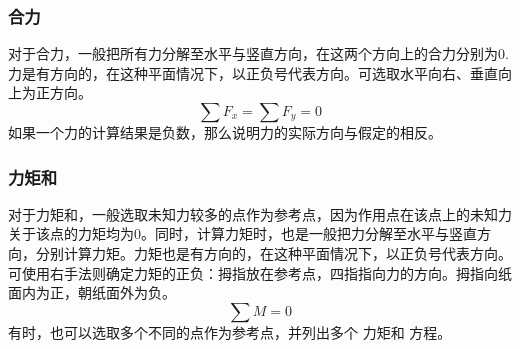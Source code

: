 \subsubsection{合力}
对于合力，一般把所有力分解至水平与竖直方向，在这两个方向上的合力分别为0. 力是有方向的，在这种平面情况下，以正负号代表方向。可选取水平向右、垂直向上为正方向。
\begin{equation}
\sum F_x=\sum F_y=0
\end{equation}
如果一个力的计算结果是负数，那么说明力的实际方向与假定的相反。

\subsubsection{力矩和}
对于力矩和，一般选取未知力较多的点作为参考点，因为作用点在该点上的未知力关于该点的力矩均为0。同时，计算力矩时，也是一般把力分解至水平与竖直方向，分别计算力矩。力矩也是有方向的，在这种平面情况下，以正负号代表方向。可使用右手法则确定力矩的正负：拇指放在参考点，四指指向力的方向。拇指向纸面内为正，朝纸面外为负。
\begin{equation}
\sum M=0
\end{equation}
有时，也可以选取多个不同的点作为参考点，并列出多个 力矩和 方程。

